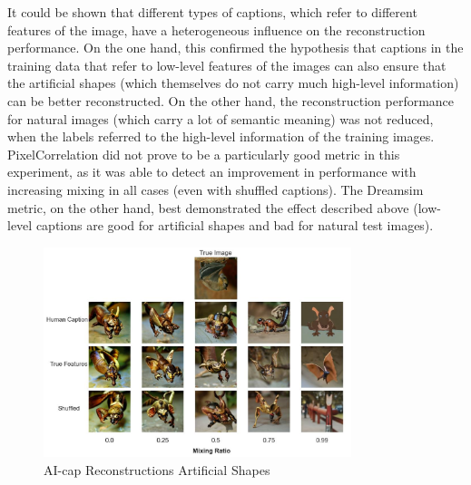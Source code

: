 It could be shown that different types of captions, which refer to different features of the image, have a heterogeneous influence on the reconstruction performance. On the one hand, this confirmed the hypothesis that captions in the training data that refer to low-level features of the images can also ensure that the artificial shapes (which themselves do not carry much high-level information) can be better reconstructed. On the other hand, the reconstruction performance for natural images (which carry a lot of semantic meaning) was not reduced,  when the labels referred to the high-level information of the training images. PixelCorrelation did not prove to be a particularly good metric in this experiment, as it was able to detect an improvement in performance with increasing mixing in all cases (even with shuffled captions). The Dreamsim metric, on the other hand, best demonstrated the effect described above (low-level captions are good for artificial shapes and bad for natural test images). 

\begin{figure}[ht]
    \centering
    \includegraphics[width=0.8\textwidth]{plots/aicap_reconstruction_evolution_test_0.JPEG}
    \caption{AI-cap Reconstructions Artificial Shapes}\label{fig:aicap_reconstruction_evolution_test_0}
\end{figure}

